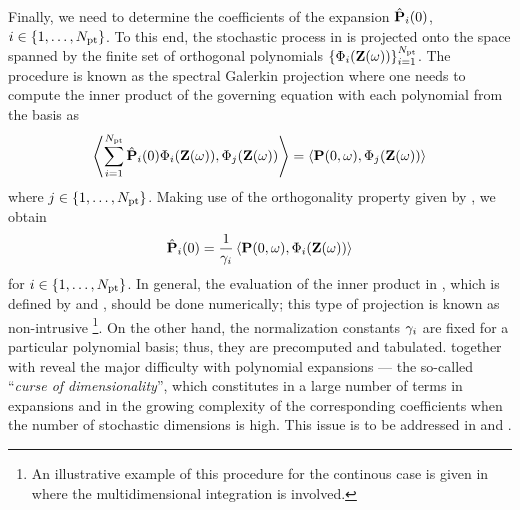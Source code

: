 Finally, we need to determine the coefficients of the expansion $\hat{\mathbf{P}}_i(0)$, $i \in \{ 1, \dotsc, {N_\text{pt}} \}$. To this end, the stochastic process in  is projected onto the space spanned by the finite set of orthogonal polynomials $\{ \Phi_i(\mathbf{Z}(\omega)) \}_{i = 1}^{{N_\text{pt}}}$. The procedure is known as the spectral Galerkin projection where one needs to compute the inner product of the governing equation  with each polynomial from the basis as
\[
  \oInner{\sum_{i=1}^{\pcterms} \pcc{\vP}_i(0) \pcb_i(\vZ(\o))}{\pcb_j(\vZ(\o))} = \oInner{\vP(0, \o)}{\pcb_j(\vZ(\o))}
\]
where $j \in \{ 1, \dotsc, {N_\text{pt}} \}$. Making use of the orthogonality property given by , we obtain
\begin{equation} \elabel{pc-coefficients}
  \pcc{\vP}_i(0) = \frac{1}{\pcn_i} \oInner{\vP(0, \o)}{\pcb_i(\vZ(\o))}
\end{equation}
for $i \in \{ 1, \dotsc, {N_\text{pt}} \}$. In general, the evaluation of the inner product in , which is defined by  and , should be done numerically; this type of projection is known as non-intrusive \footnote{An illustrative example of this procedure for the continous case is given in  where the multidimensional integration is involved.}. On the other hand, the normalization constants $\gamma_i$ are fixed for a particular polynomial basis; thus, they are precomputed and tabulated.  together with  reveal the major difficulty with polynomial expansions --- the so-called ``\emph{curse of dimensionality}'', which constitutes in a large number of terms in expansions and in the growing complexity of the corresponding coefficients when the number of stochastic dimensions is high. This issue is to be addressed in  and .

